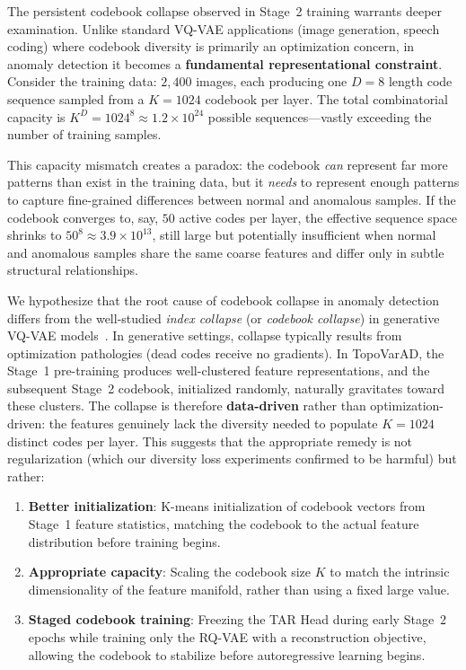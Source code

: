 \documentclass[lettersize,journal]{IEEEtran}
\begin{document}
The persistent codebook collapse observed in Stage~2 training warrants deeper examination. Unlike standard VQ-VAE applications (image generation, speech coding) where codebook diversity is primarily an optimization concern, in anomaly detection it becomes a \textbf{fundamental representational constraint}. Consider the training data: $2{,}400$ images, each producing one $D = 8$ length code sequence sampled from a $K = 1024$ codebook per layer. The total combinatorial capacity is $K^D = 1024^8 \approx 1.2 \times 10^{24}$ possible sequences---vastly exceeding the number of training samples.

This capacity mismatch creates a paradox: the codebook \textit{can} represent far more patterns than exist in the training data, but it \textit{needs} to represent enough patterns to capture fine-grained differences between normal and anomalous samples. If the codebook converges to, say, $50$ active codes per layer, the effective sequence space shrinks to $50^8 \approx 3.9 \times 10^{13}$, still large but potentially insufficient when normal and anomalous samples share the same coarse features and differ only in subtle structural relationships.

We hypothesize that the root cause of codebook collapse in anomaly detection differs from the well-studied \textit{index collapse} (or \textit{codebook collapse}) in generative VQ-VAE models~\cite{ref7,ref8}. In generative settings, collapse typically results from optimization pathologies (dead codes receive no gradients). In TopoVarAD, the Stage~1 pre-training produces well-clustered feature representations, and the subsequent Stage~2 codebook, initialized randomly, naturally gravitates toward these clusters. The collapse is therefore \textbf{data-driven} rather than optimization-driven: the features genuinely lack the diversity needed to populate $K = 1024$ distinct codes per layer. This suggests that the appropriate remedy is not regularization (which our diversity loss experiments confirmed to be harmful) but rather:

\begin{enumerate}
\item \textbf{Better initialization}: K-means initialization of codebook vectors from Stage~1 feature statistics, matching the codebook to the actual feature distribution before training begins.
\item \textbf{Appropriate capacity}: Scaling the codebook size $K$ to match the intrinsic dimensionality of the feature manifold, rather than using a fixed large value.
\item \textbf{Staged codebook training}: Freezing the TAR Head during early Stage~2 epochs while training only the RQ-VAE with a reconstruction objective, allowing the codebook to stabilize before autoregressive learning begins.
\end{enumerate}
\end{document}
